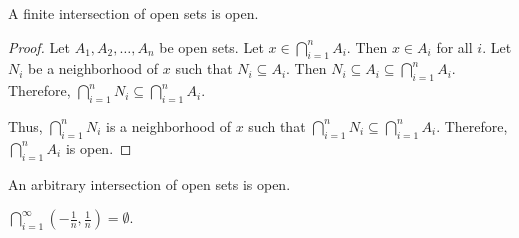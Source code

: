 \begin{theorem}{}{}
    A finite intersection of open sets is open.
\end{theorem}
\begin{proof}
    Let $A_1, A_2, \ldots, A_n$ be open sets. Let $x \in \bigcap_{i=1}^n A_i$. Then $x \in A_i$ for all $i$. Let $N_i$ be a neighborhood of $x$ such that $N_i \subseteq A_i$. Then $N_i \subseteq A_i \subseteq \bigcap_{i=1}^n A_i$. Therefore, $\bigcap_{i=1}^n N_i \subseteq \bigcap_{i=1}^n A_i$. 
    
    Thus, $\bigcap_{i=1}^n N_i$ is a neighborhood of $x$ such that $\bigcap_{i=1}^n N_i \subseteq \bigcap_{i=1}^n A_i$. Therefore, $\bigcap_{i=1}^n A_i$ is open.
\end{proof}

\begin{theorem}{}{}
    An arbitrary intersection of open sets is open.
\end{theorem}
\begin{note}
    $\bigcap_{i=1}^\infty (-\frac{1}{n}, \frac{1}{n}) = \emptyset$.
\end{note}